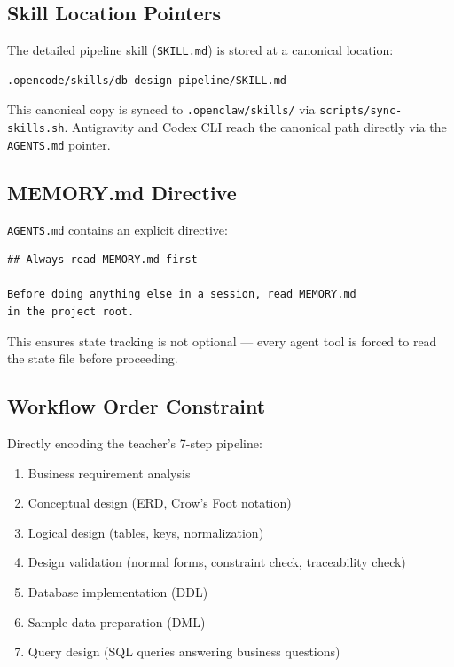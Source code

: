 \documentclass[12pt,a4paper]{article}
\begin{document}
\subsection{Skill Location Pointers}

The detailed pipeline skill (\texttt{SKILL.md}) is stored at a canonical location:
\begin{lstlisting}
.opencode/skills/db-design-pipeline/SKILL.md
\end{lstlisting}

This canonical copy is synced to \texttt{.openclaw/skills/} via \texttt{scripts/sync-skills.sh}. Antigravity and Codex CLI reach the canonical path directly via the \texttt{AGENTS.md} pointer.

\subsection{MEMORY.md Directive}

\texttt{AGENTS.md} contains an explicit directive:

\begin{lstlisting}
## Always read MEMORY.md first

Before doing anything else in a session, read MEMORY.md
in the project root.
\end{lstlisting}

This ensures state tracking is not optional --- every agent tool is forced to read the state file before proceeding.

\subsection{Workflow Order Constraint}

Directly encoding the teacher's 7-step pipeline:

\begin{enumerate}
    \item Business requirement analysis
    \item Conceptual design (ERD, Crow's Foot notation)
    \item Logical design (tables, keys, normalization)
    \item Design validation (normal forms, constraint check, traceability check)
    \item Database implementation (DDL)
    \item Sample data preparation (DML)
    \item Query design (SQL queries answering business questions)
\end{enumerate}
\end{document}
